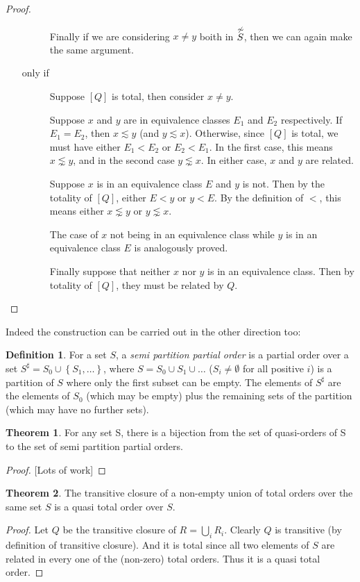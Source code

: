 \documentclass[12pt]{article}
\theoremstyle{definition}
\newtheorem{definition}{Definition}[section]
\theoremstyle{theorem}
\newtheorem{theorem}{Theorem}[section]
\def\aset#1{\left\{{#1}\right\}}
\begin{document}
\begin{proof}
\begin{itemize}
\begin{description}
      Finally if we are considering \( x \neq y\) boith in \(
      \stackrel{\not\sim}{S} \), then
      we can again make the same argument.

    \item[only if]  Suppose $[Q]$ is total, then consider $x\neq y$.

      Suppose $x$ and $y$ are in equivalence classes $E_1$ and $E_2$
      respectively.  If $E_1 = E_2$, then $x \lesssim y$
      (and $y \lesssim x$).  Otherwise, since $[Q]$ is total, we must
      have either $E_1 < E_2$ or $E_2 < E_1$.  In the first case, this
      means $x \lnsim y$, and in the second case $y \lnsim x$.
      In either case, $x$
      and $y$ are related.

      Suppose $x$ is in an equivalence class $E$ and $y$ is not.
      Then by the totality of $[Q]$, either $E < y$ or
      $y < E$.  By the definition of $<$, this means either $x \lnsim
      y$ or \( y \lnsim x\).
      
      The case of $x$ not being in an equivalence class while $y$
      is in an equivalence class $E$ is analogously proved.

      Finally suppose that neither $x$ nor $y$ is in an equivalence
      class.  Then by totality of $[Q]$, they must be related by $Q$.
    \end{description}
  \end{itemize}
\end{proof}

Indeed the construction can be carried out in the other direction too:
\begin{definition}
  For a set $S$, a \emph{semi partition partial order} is a partial
  order over a set \(S^{\sharp} = S_0 \cup \aset{S_1,\ldots}\), where  \(S =
  S_0 \cup S_1 \cup \ldots \) ($S_i\neq \emptyset$ for all
  positive $i$) is a partition of $S$ where only the first subset can
  be empty. The elements of
  \(S^{\sharp}\) are the elements of $S_0$ (which may be empty) plus
  the remaining sets of the partition (which may have no further sets).
\end{definition}
\begin{theorem}
  For any set S, there is a bijection from the set of quasi-orders of
  S to the set of semi partition partial orders.
\end{theorem}
\begin{proof}
  {[Lots of work]}
\end{proof}

\begin{theorem}
  The transitive closure of a non-empty union of total orders over the
  same set $S$ is a
  quasi total order over $S$.
\end{theorem}
\begin{proof}
  Let \( Q \) be the transitive closure of \(R = \bigcup_i R_i\).  Clearly
  $Q$ is transitive (by definition of transitive closure).  And it is
  total since all two elements of $S$ are related in every one of the
  (non-zero) total orders.  Thus it is a quasi total order.
\end{proof}
\end{document}
